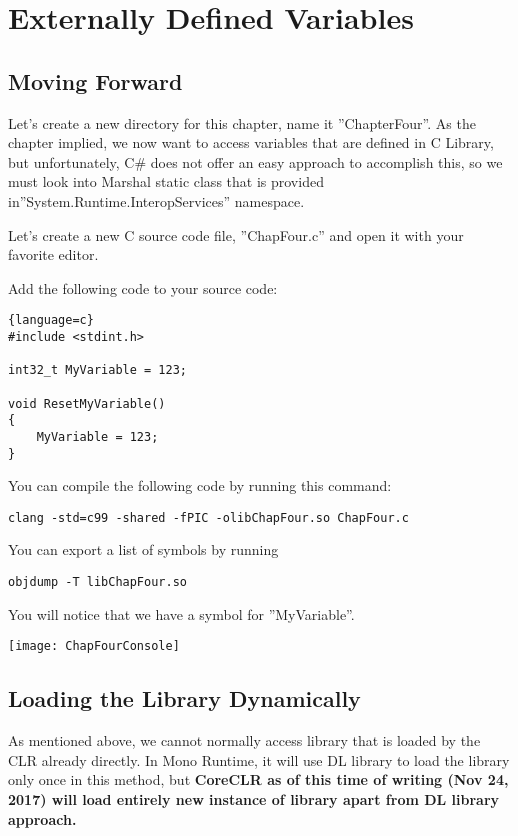 \chapter{Externally Defined Variables}
\section{Moving Forward}
Let's create a new directory for this chapter, name it ''ChapterFour''. As the chapter implied, we now want to access variables that are defined in C Library, but unfortunately, C\# does not offer an easy approach to accomplish this, so we must look into Marshal static class that is provided in\newline ''System.Runtime.InteropServices'' namespace.

Let's create a new C source code file, ''ChapFour.c'' and open it with your favorite editor.

Add the following code to your source code:

\begin{lstlisting}{language=c}
#include <stdint.h>

int32_t MyVariable = 123;

void ResetMyVariable()
{
	MyVariable = 123;
}
\end{lstlisting}

You can compile the following code by running this command:

\begin{lstlisting}
clang -std=c99 -shared -fPIC -olibChapFour.so ChapFour.c
\end{lstlisting}
\newpage
You can export a list of symbols by running 
\begin{lstlisting}
objdump -T libChapFour.so
\end{lstlisting}

You will notice that we have a symbol for ''MyVariable''.

\texttt{[image: ChapFourConsole]}

\section{Loading the Library Dynamically}
As mentioned above, we cannot normally access library that is loaded by the CLR already directly. In Mono Runtime, it will use DL library to load the library only once in this method, but \textbf{CoreCLR as of this time of writing (Nov 24, 2017) will load entirely new instance of library apart from DL library approach.}

